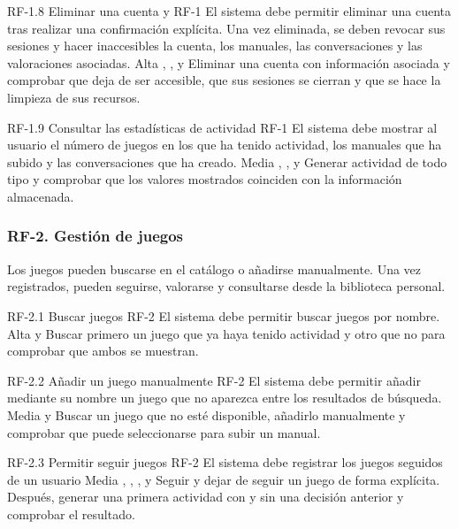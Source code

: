 \requisitoFuncional
{RF-1.8}
{Eliminar una cuenta}
{ y }
{RF-1}
{El sistema debe permitir eliminar una cuenta tras realizar una confirmación
explícita. Una vez eliminada, se deben revocar sus sesiones y hacer inaccesibles
la cuenta, los manuales, las conversaciones y las valoraciones asociadas. }
{Alta}
{, ,  y
}
{Eliminar una cuenta con información asociada y comprobar que deja de ser
accesible, que sus sesiones se cierran y que se hace la limpieza de sus
recursos.}

\requisitoFuncional
{RF-1.9}
{Consultar las estadísticas de actividad}
{}
{RF-1}
{El sistema debe mostrar al usuario el número de juegos en los que ha tenido
actividad, los manuales que ha subido y las conversaciones que ha creado.}
{Media}
{, ,  y
}
{Generar actividad de todo tipo y comprobar que los valores mostrados
coinciden con la información almacenada.}

\subsubsection{RF-2. Gestión de juegos}

Los juegos pueden buscarse en el catálogo o añadirse manualmente. Una vez
registrados, pueden seguirse, valorarse y consultarse desde la biblioteca
personal.

\requisitoFuncional
{RF-2.1}
{Buscar juegos}
{}
{RF-2}
{El sistema debe permitir buscar juegos por nombre.}
{Alta}
{ y }
{Buscar primero un juego que ya haya tenido actividad y otro que no para
comprobar que ambos se muestran.}

\requisitoFuncional
{RF-2.2}
{Añadir un juego manualmente}
{}
{RF-2}
{El sistema debe permitir añadir mediante su nombre un juego que no aparezca
entre los resultados de búsqueda.}
{Media}
{ y }
{Buscar un juego que no esté disponible, añadirlo manualmente y comprobar que
puede seleccionarse para subir un manual.}

\requisitoFuncional
{RF-2.3}
{Permitir seguir juegos}
{}
{RF-2}
{El sistema debe registrar los juegos seguidos de un usuario
}
{Media}
{, , ,
 y }
{Seguir y dejar de seguir un juego de forma explícita. Después, generar una
primera actividad con y sin una decisión anterior y comprobar el resultado.}

